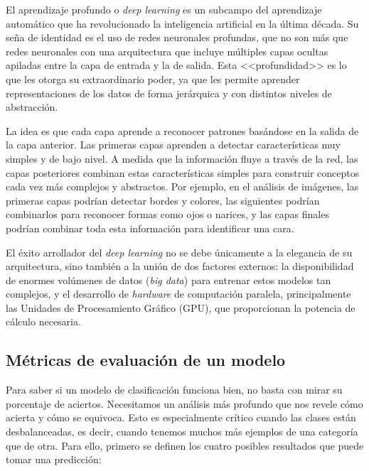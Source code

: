 El aprendizaje profundo o \textit{deep learning} es un subcampo del aprendizaje automático que ha revolucionado la inteligencia artificial en la última década. Su seña de identidad es el uso de redes neuronales profundas, que no son más que redes neuronales con una arquitectura que incluye múltiples capas ocultas apiladas entre la capa de entrada y la de salida. Esta <<profundidad>> es lo que les otorga su extraordinario poder, ya que les permite aprender representaciones de los datos de forma jerárquica y con distintos niveles de abstracción.

La idea es que cada capa aprende a reconocer patrones basándose en la salida de la capa anterior. Las primeras capas aprenden a detectar características muy simples y de bajo nivel. A medida que la información fluye a través de la red, las capas posteriores combinan estas características simples para construir conceptos cada vez más complejos y abstractos. Por ejemplo, en el análisis de imágenes, las primeras capas podrían detectar bordes y colores, las siguientes podrían combinarlos para reconocer formas como ojos o narices, y las capas finales podrían combinar toda esta información para identificar una cara.

El éxito arrollador del \textit{deep learning} no se debe únicamente a la elegancia de su arquitectura, sino también a la unión de dos factores externos: la disponibilidad de enormes volúmenes de datos (\textit{big data}) para entrenar estos modelos tan complejos, y el desarrollo de \textit{hardware} de computación paralela, principalmente las Unidades de Procesamiento Gráfico (GPU), que proporcionan la potencia de cálculo necesaria.

\subsection{Métricas de evaluación de un modelo}

Para saber si un modelo de clasificación funciona bien, no basta con mirar su porcentaje de aciertos. Necesitamos un análisis más profundo que nos revele cómo acierta y cómo se equivoca. Esto es especialmente crítico cuando las clases están desbalanceadas, es decir, cuando tenemos muchos más ejemplos de una categoría que de otra. Para ello, primero se definen los cuatro posibles resultados que puede tomar una predicción:

